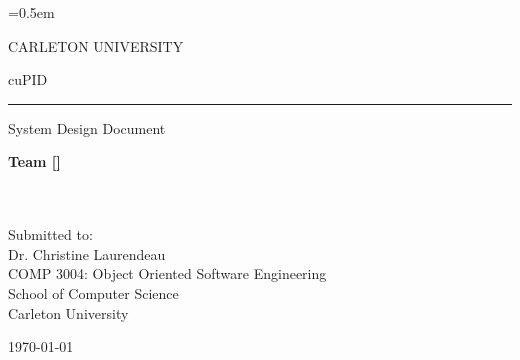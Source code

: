 \documentclass[12pt,letterpaper]{article}
\begin{document}
\renewcommand{\theoperationnum}{\twodigits{operationnum}}
\newcommand{\oplabel}[1]{\refstepcounter{operationnum}\label{op:#1}}
\newcommand{\opref}[1]{\textbf{OP-\ref{op:#1}}}

\renewcommand{\thedbtablenum}{\twodigits{dbtablenum}}
\newcommand{\dtlabel}[1]{\refstepcounter{dbtablenum}\label{dt:#1}}
\newcommand{\dtref}[1]{\textbf{DT-\ref{dt:#1}}}

\everyrow{\hline}
\tabulinesep=0.5em


\thispagestyle{empty}

\begin{center}
	CARLETON UNIVERSITY
\end{center}

\vfill

\begin{center}
	{\fontsize{55pt}{55pt}\selectfont cuPID}
	\vspace{0.5em}\rule{\textwidth}{0.5pt}
	System Design Document
\end{center}

\vspace{5em}

\begin{center}
	\textbf{Team [\teamname{}]}\\
	\personone{}\\
	\persontwo{}\\
	\personthree{}
\end{center}

\vfill

\begin{center}
	Submitted to:\\
	Dr. Christine Laurendeau\\
	COMP 3004: Object Oriented Software Engineering\\
	School of Computer Science\\
	Carleton University
\end{center}

\vspace{2em}

\begin{center}
	\today
\end{center}
\end{document}
